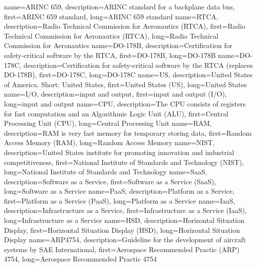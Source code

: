 {%
    name={ARINC 659},
    description={ARINC standard for a backplane data bus},
    first={ARINC 659 standard},
    long={ARINC 659 standard}
}
{%
    name={RTCA},
    description={Radio Technical Commission for Aeronautics (RTCA)},
    first={Radio Technical Commission for Aeronautics (RTCA)},
    long={Radio Technical Commission for Aeronautics}
}
{%
    name={DO-178B},
    description={Certification for safety-critical software by the RTCA},
    first={DO-178B},
    long={DO-178B}
}
{%
    name={DO-178C},
    description={Certification for safety-critical software by the RTCA (replaces DO-178B)},
    first={DO-178C},
    long={DO-178C}
}
{%
    name={US},
    description={United States of America. Short: United States},
    first={United States (US)},
    long={United States}
}
{%
    name={I/O},
    description={input and output},
    first={input and output (I/O)},
    long={input and output}
}
{%
    name={CPU},
    description={The CPU consists of registers for fast computation and an Algorithmic Logic Unit (ALU)},
    first={Central Processing Unit (CPU)},
    long={Central Processing Unit}
}
{%
    name={RAM},
    description={RAM is very fast memory for temporary storing data},
    first={Random Access Memory (RAM)},
    long={Random Access Memory}
}
{%
    name={NIST},
    description={United States institute for promoting innovation and industrial competitiveness},
    first={National Institute of Standards and Technology (NIST)},
    long={National Institute of Standards and Technology}
}
{%
    name={SaaS},
    description={Software as a Service},
    first={Software as a Service (SaaS)},
    long={Software as a Service}
}
{%
    name={PaaS},
    description={Platform as a Service},
    first={Platform as a Service (PaaS)},
    long={Platform as a Service}
}
{%
    name={IaaS},
    description={Infrastructure as a Service},
    first={Infrastructure as a Service (IaaS)},
    long={Infrastructure as a Service}
}
{%
    name={HSD},
    description={Horizontal Situation Display},
    first={Horizontal Situation Display (HSD)},
    long={Horizontal Situation Display}
}
{%
    name={ARP4754},
    description={Guideline for the development of aircraft systems by SAE International},
    first={Aerospace Recommended Practic (ARP) 4754},
    long={Aerospace Recommended Practic 4754}
}

